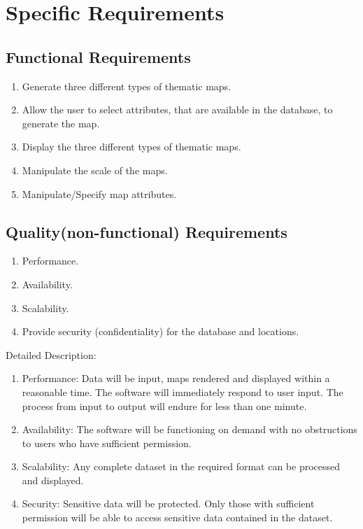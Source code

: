 \documentclass{article}
\begin{document}
	\section{Specific Requirements}
    	\subsection{Functional Requirements}
        \begin{enumerate}[label=\alph*]
        \item Generate three different types of thematic maps.
		\item Allow the user to select attributes, that are available in the database, to generate the map.
		\item Display the three different types of thematic maps.
		\item Manipulate the scale of the maps.
        \item Manipulate/Specify map attributes.
        \end{enumerate}
        \subsection{Quality(non-functional) Requirements}
        \begin{enumerate}[label=\alph*]
        \item Performance.
		\item Availability.
		\item Scalability.
        \item Provide security (confidentiality) for the database and locations.\\
        \end{enumerate}
        Detailed Description:
        \begin{enumerate}[label=\alph*]
        \item Performance: Data will be input, maps rendered and displayed within a reasonable time. The software will immediately respond to user input. The process from input to output will endure for less than one minute. 
		\item Availability: The software will be functioning on demand with no obstructions to users who have sufficient permission.
		\item Scalability: Any complete dataset in the required format can be processed and displayed.
		 \item Security: Sensitive data will be protected. Only those with sufficient permission will be able to access sensitive data contained in the dataset.
        \end{enumerate}
        
\end{document}
